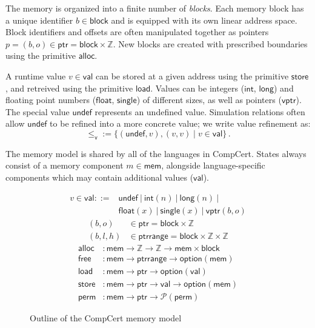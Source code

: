 \documentclass[acmsmall,authordraft]{acmart}
\newcommand{\kw}[1]{\ensuremath{ \mathsf{#1} }}
\newcommand{\alt}{\ |\ } %
\newcommand{\vref}{\le_\kw{v}}
\begin{document}
The memory is organized into a finite number of \emph{blocks}.
Each memory block has a unique identifier $b \in \kw{block}$
and is equipped with its own linear address space.
Block identifiers and offsets are often manipulated together
as pointers $p = (b, o) \in \kw{ptr} = \kw{block} \times \mathbb{Z}$.
New blocks are created with prescribed boundaries
using the primitive $\kw{alloc}$.

A runtime value $v \in \kw{val}$ can be stored at
a given address using the primitive \kw{store},
and retreived using the primitive \kw{load}.
Values can be integers (\kw{int}, \kw{long}) and
floating point numbers (\kw{float}, \kw{single})
of different sizes,
as well as pointers (\kw{vptr}).
The special value \kw{undef}
represents an undefined value.
Simulation relations
often allow $\kw{undef}$
to be refined into a more concrete value;
we write value refinement as:
\[
    {\vref} := \{(\kw{undef}, v), (v, v) \mid v \in \kw{val}\} \,.
\]

The memory model is shared by all of the languages in CompCert.
States always consist of
a memory component $m \in \kw{mem}$,
alongside language-specific components
which may contain additional values ($\kw{val}$).


\begin{figure} %
  \begin{align*}
    v \in \kw{val} ::= {} &
          \kw{undef} \alt
          \kw{int}(n) \alt
          \kw{long}(n) \alt \\ &
          \kw{float}(x) \alt
          \kw{single}(x) \alt
          \kw{vptr}(b, o)
  \end{align*}
  \begin{align*}
    (b, o) &\in \kw{ptr} =
      \kw{block} \times \mathbb{Z}
    \\
    (b, l, h) &\in \kw{ptrrange} =
      \kw{block} \times \mathbb{Z} \times \mathbb{Z}
  \end{align*}
  \begin{align*}
    \kw{alloc} &:
      \kw{mem} \rightarrow \mathbb{Z} \rightarrow \mathbb{Z} \rightarrow
      \kw{mem} \times \kw{block}
    \\
    \kw{free} &:
      \kw{mem} \rightarrow
      \kw{ptrrange} \rightarrow
      \kw{option}(\kw{mem})
    \\
    \kw{load} &:
      \kw{mem} \rightarrow \kw{ptr} \rightarrow \kw{option}(\kw{val})
    \\
    \kw{store} &:
      \kw{mem} \rightarrow \kw{ptr} \rightarrow \kw{val} \rightarrow \kw{option}(\kw{mem})
    \\
    \kw{perm} &:
      \kw{mem} \rightarrow \kw{ptr} \rightarrow \mathcal{P}(\kw{perm})
  \end{align*}
  \caption{Outline of the CompCert memory model}
  \label{fig:mm}
\end{figure}
\end{document}
